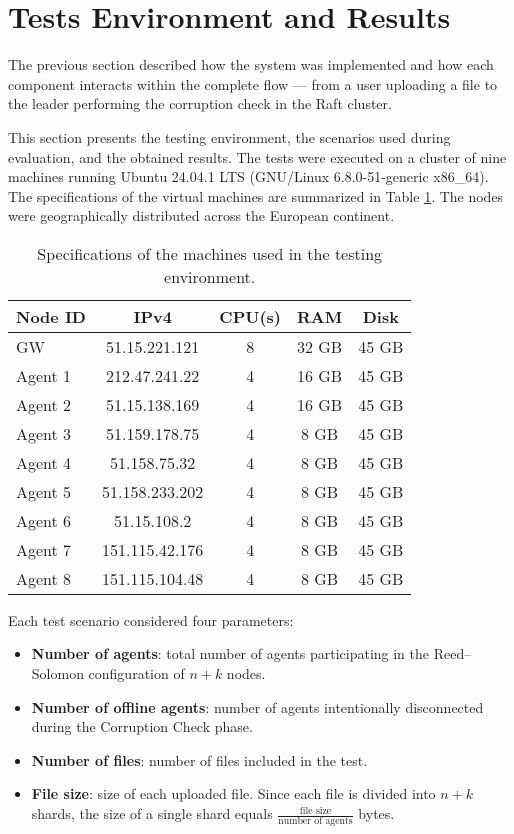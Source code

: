 \section{Tests Environment and Results}

The previous section described how the system was implemented and how each component interacts within the complete flow — from a user uploading a file to the leader performing the corruption check in the Raft cluster.

This section presents the testing environment, the scenarios used during evaluation, and the obtained results. The tests were executed on a cluster of nine machines running Ubuntu 24.04.1 LTS (GNU/Linux 6.8.0-51-generic x86\_64). The specifications of the virtual machines are summarized in Table \ref{tab:vms-specs}. The nodes were geographically distributed across the European continent.

\begin{table}[h!]
    \centering
    \begin{tabular}{|l|c|c|c|c|}
    \hline
       \textbf{Node ID} & \textbf{IPv4} & \textbf{CPU(s)} & \textbf{RAM} & \textbf{Disk} \\
       \hline
        GW & 51.15.221.121 & 8 & 32 GB & 45 GB \\
        Agent 1 & 212.47.241.22 & 4 & 16 GB & 45 GB \\
        Agent 2 & 51.15.138.169 & 4 & 16 GB & 45 GB \\
        Agent 3 & 51.159.178.75 & 4 & 8 GB & 45 GB \\
        Agent 4 & 51.158.75.32 & 4 & 8 GB & 45 GB \\
        Agent 5 & 51.158.233.202 & 4 & 8 GB & 45 GB \\
        Agent 6 & 51.15.108.2 & 4 & 8 GB & 45 GB \\
        Agent 7 & 151.115.42.176 & 4 & 8 GB & 45 GB \\
        Agent 8 & 151.115.104.48 & 4 & 8 GB & 45 GB \\
        \hline
    \end{tabular}
    \caption{Specifications of the machines used in the testing environment.}
    \label{tab:vms-specs}
\end{table}

Each test scenario considered four parameters:
\begin{itemize}
    \item \textbf{Number of agents}: total number of agents participating in the Reed–Solomon configuration of $n + k$ nodes.
    \item \textbf{Number of offline agents}: number of agents intentionally disconnected during the Corruption Check phase.
    \item \textbf{Number of files}: number of files included in the test.
    \item \textbf{File size}: size of each uploaded file. Since each file is divided into $n + k$ shards, the size of a single shard equals $\frac{\text{file size}}{\text{number of agents}}$ bytes.
\end{itemize}

